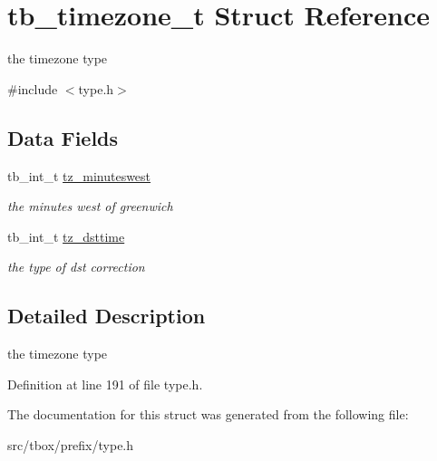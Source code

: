 \hypertarget{structtb__timezone__t}{\section{tb\-\_\-timezone\-\_\-t Struct Reference}
\label{structtb__timezone__t}
}


the timezone type  




{\ttfamily \#include $<$type.\-h$>$}

\subsection*{Data Fields}
\begin{DoxyCompactItemize}
\item 
\hypertarget{structtb__timezone__t_a53c1537f04f8f2455ff2c04819447282}{tb\-\_\-int\-\_\-t \hyperlink{structtb__timezone__t_a53c1537f04f8f2455ff2c04819447282}{tz\-\_\-minuteswest}}\label{structtb__timezone__t_a53c1537f04f8f2455ff2c04819447282}

\begin{DoxyCompactList}\small\item\em the minutes west of greenwich \end{DoxyCompactList}\item 
\hypertarget{structtb__timezone__t_aeeff2ac3fce2123adf7c6254edf282b9}{tb\-\_\-int\-\_\-t \hyperlink{structtb__timezone__t_aeeff2ac3fce2123adf7c6254edf282b9}{tz\-\_\-dsttime}}\label{structtb__timezone__t_aeeff2ac3fce2123adf7c6254edf282b9}

\begin{DoxyCompactList}\small\item\em the type of dst correction \end{DoxyCompactList}\end{DoxyCompactItemize}


\subsection{Detailed Description}
the timezone type 

Definition at line 191 of file type.\-h.



The documentation for this struct was generated from the following file\-:\begin{DoxyCompactItemize}
\item 
src/tbox/prefix/type.\-h\end{DoxyCompactItemize}
